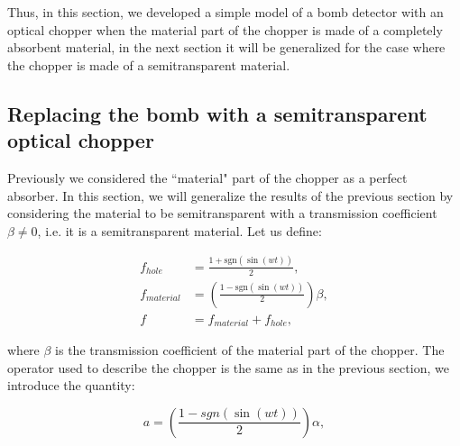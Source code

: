 \documentclass[12pt]{book}
\begin{document}
Thus, in this section, we developed a simple model of a bomb detector with  an optical chopper when the material part of the chopper is made of a completely absorbent material, in the next section it will be generalized for the case where the chopper is made of a semitransparent material.

\subsection{Replacing the bomb with a semitransparent optical chopper }

Previously we considered the ``material" part of the chopper as a perfect absorber. In this section,  we will generalize the results of the previous section by considering the material to be semitransparent with a transmission coefficient $\beta \neq 0$, i.e. it is a semitransparent material. Let us define: 
 

\begin{align}
f_{hole}&=\frac{1+\mathrm{sgn}(\sin(wt))}{2},\label{beta111}\\
f_{material}&=\left(\frac{1-\mathrm{sgn}(\sin(wt))}{2} \right)\beta,\label{beta11}\\
f&=f_{material}+f_{hole}, \label{beta1}
\end{align}


where $\beta$ is the transmission coefficient of the material part of the chopper. The operator used to describe the chopper is the same as in the previous section, we introduce the quantity:


\begin{equation}
a=\left(\frac{1-sgn(\sin(wt))}{2}\right) \alpha,
\end{equation}
\end{document}
